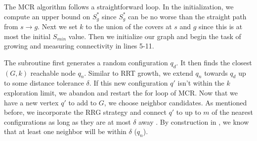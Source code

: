 {}

The MCR algorithm follows a straightforward loop. In the initialization, we compute an upper bound on $S^{*}_g$ since $S^{*}_g$ can be no worse than the straight path from $s \rightarrow g$. Next we set $k$ to the union of the covers at $s$ and $g$ since this is at most the initial $S_{min}$ value. Then we initialize our graph and begin the task of growing and measuring connectivity in lines 5-11. 

The subroutine  first generates a random configuration $q_d$. It then finds the closest $(G,k)$ reachable node $q_n$. Similar to RRT growth, we extend $q_n$ towards $q_d$ up to some distance tolerance $\delta$. If this new configuration $q'$ isn't within the $k$ exploration limit, we abandon and restart the for loop of MCR. Now that we have a new vertex $q'$ to add to $G$, we choose neighbor candidates. As mentioned before, we incorporate the RRG strategy and connect $q'$ to up to $m$ of the nearest configurations as long as they are at most $\delta$ away \cite{karaman:rrg}. By construction in , we know that at least one neighbor will be within $\delta$ ($q_n$). 

